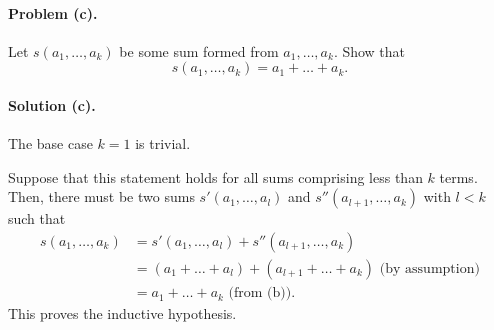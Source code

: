 \documentclass{article}
\begin{document}
\paragraph{Problem (c).} Let $s(a_1, \ldots, a_k)$ be some sum formed from
$a_1, \ldots, a_k$. Show that \begin{equation*}
  s(a_1, \ldots, a_k) = a_1 + \ldots + a_k.
\end{equation*}

\paragraph{Solution (c).} The base case $k = 1$ is trivial.

Suppose that this statement holds for all sums comprising less than $k$ terms.
Then, there must be two sums $s'(a_1, \ldots, a_l)$ and $s''(a_{l+1}, \ldots,
a_k)$ with $l < k$ such that \begin{align*}
  s(a_1, \ldots, a_k) &= s'(a_1, \ldots, a_l) + s''(a_{l+1}, \ldots, a_k) \\
    &= (a_1 + \ldots + a_l) + (a_{l+1} + \ldots + a_k) \text{ (by assumption)}
    \\
    &= a_1 + \ldots + a_k \text{ (from (b))}.
\end{align*} This proves the inductive hypothesis.
\end{document}
